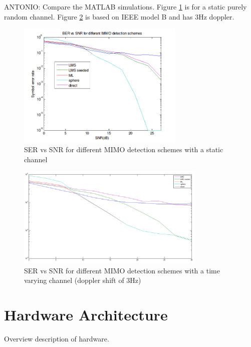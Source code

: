 \documentclass[journal]{IEEEtran}
\begin{document}
ANTONIO:
Compare the MATLAB simulations. Figure \ref{ser_snr_different_schemes_static} is for a static purely random channel. Figure \ref{ser_snr_different_schemes_dynamic} is based on IEEE model B and has 3Hz doppler.

\begin{figure}[!h]
\centering
\includegraphics[width=8cm]{images/static_channel_decoder_comparison.png}
\caption{SER vs SNR for different MIMO detection schemes with a static channel}
\label{ser_snr_different_schemes_static}
\end{figure}

\begin{figure}[!h]
\centering
\includegraphics[width=9cm]{images/time_varying_channel_doppler_3.png}
\caption{SER vs SNR for different MIMO detection schemes with a time varying channel (doppler shift of 3Hz)}
\label{ser_snr_different_schemes_dynamic}
\end{figure}


\section{Hardware Architecture}

Overview description of hardware.
\end{document}
